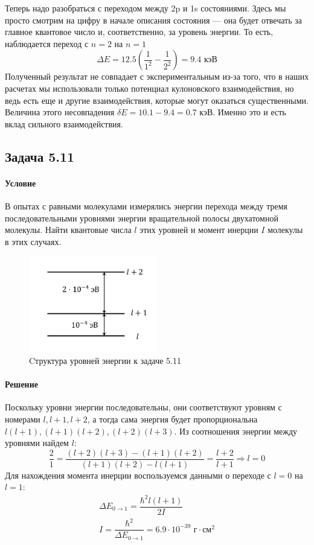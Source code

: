 \documentclass[12pt]{article}
\begin{document}
\vspace{1em} \noindent
Теперь надо разобраться с переходом между 2p и 1s состояниями. Здесь мы просто смотрим на цифру в начале описания состояния --- она будет отвечать за главное квантовое число и, соответственно, за уровень энергии. То есть, наблюдается переход с $n=2$ на $n=1$
\begin{equation*}
    \Delta E = 12.5\left(\dfrac{1}{1^2} - \dfrac{1}{2^2}\right) = 9.4 \text{ кэВ}
\end{equation*}
Полученный результат не совпадает с экспериментальным из-за того, что в наших расчетах мы использовали только потенциал кулоновского взаимодействия, но ведь есть еще и другие взаимодействия, которые могут оказаться существенными. Величина этого несовпадения $\delta E = 10.1 - 9.4 = 0.7$ кэВ. Именно это и есть вклад сильного взаимодействия. 


\subsection{Задача 5.11}
\label{task_5.11}
\paragraph{Условие} В опытах с равными молекулами измерялись энергии перехода между тремя последовательными уровнями энергии вращательной полосы двухатомной молекулы. Найти
квантовые числа $l$ этих уровней и момент инерции $I$ молекулы в этих случаях.
\begin{figure}[h]
    \centering
    \includegraphics[width=0.5\textwidth,height=\textheight,keepaspectratio]{Seminar_06/pics/pic_04.pdf}
    \caption{Cтруктура уровней энергии к задаче 5.11}
\end{figure}
\paragraph{Решение}
Поскольку уровни энергии последовательны, они соответствуют уровням с номерами $l, l+1, l+2$, а тогда сама энергия будет пропорциональна $l(l+1), (l+1)(l+2), (l+2)(l+3)$. Из соотношения энергии между уровнями найдем $l$:
\begin{equation*}
    \dfrac{2}{1} = \dfrac{(l+2)(l+3)-(l+1)(l+2)}{(l+1)(l+2)-l(l+1)} = \dfrac{l+2}{l+1} \Rightarrow l=0
\end{equation*}
Для нахождения момента инерции воспользуемся данными о переходе с $l=0$ на $l=1$:
\begin{gather*}
    \Delta E_{0\rightarrow 1} = \dfrac{\hbar^2 l(l+1)}{2I}\\
    I = \dfrac{\hbar^2}{\Delta E_{0\rightarrow 1}} = 6.9\cdot 10^{-39} \text{ г}\cdot\text{см}^2
\end{gather*}
\end{document}

